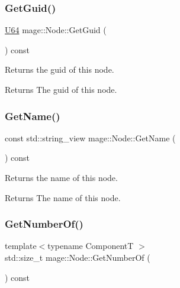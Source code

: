 \subsubsection{\texorpdfstring{Get\+Guid()}{GetGuid()}}
{\footnotesize\ttfamily \mbox{\hyperlink{namespacemage_ae0ad2dd0035dba92ed0f2e84c182b03b}{U64}} mage\+::\+Node\+::\+Get\+Guid (\begin{DoxyParamCaption}{ }\end{DoxyParamCaption}) const\hspace{0.3cm}{\ttfamily [noexcept]}}

Returns the guid of this node.

\begin{DoxyReturn}{Returns}
The guid of this node. 
\end{DoxyReturn}
\mbox{\label{classmage_1_1_node_a171831821f1f46817dd58769161bd888}} 
\subsubsection{\texorpdfstring{Get\+Name()}{GetName()}}
{\footnotesize\ttfamily const std\+::string\+\_\+view mage\+::\+Node\+::\+Get\+Name (\begin{DoxyParamCaption}{ }\end{DoxyParamCaption}) const\hspace{0.3cm}{\ttfamily [noexcept]}}

Returns the name of this node.

\begin{DoxyReturn}{Returns}
The name of this node. 
\end{DoxyReturn}
\mbox{\label{classmage_1_1_node_a50932c5cc58d9cbf18380bebdcaa7717}} 
\subsubsection{\texorpdfstring{Get\+Number\+Of()}{GetNumberOf()}}
{\footnotesize\ttfamily template$<$typename ComponentT $>$ \\
std\+::size\+\_\+t mage\+::\+Node\+::\+Get\+Number\+Of (\begin{DoxyParamCaption}{ }\end{DoxyParamCaption}) const\hspace{0.3cm}{\ttfamily [noexcept]}}

